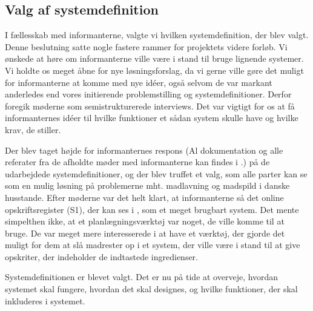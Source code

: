 \subsection{Valg af systemdefinition}
\label{subsec:valgafsystemdefinition}

I fællesskab med informanterne, valgte vi hvilken systemdefinition, der blev valgt. Denne beslutning satte nogle fastere rammer for projektets videre forløb. Vi ønskede at høre om informanterne ville være i stand til bruge lignende systemer. Vi holdte os meget åbne for nye løsningsforslag, da vi gerne ville gøre det muligt for informanterne at komme med nye idéer, også selvom de var markant anderledes end vores initierende problemstilling og systemdefinitioner. Derfor foregik møderne som semistrukturerede interviews. Det var vigtigt for os at få informanternes idéer til hvilke funktioner et sådan system skulle have og hvilke krav, de stiller.

Der blev taget højde for informanternes respons (Al dokumentation og alle referater fra de afholdte møder med informanterne kan findes i .) på de udarbejdede systemdefinitioner, og der blev truffet et valg, som alle parter kan se som en mulig løsning på problemerne mht. madlavning og madspild i danske husstande. Efter møderne var det helt klart, at informanterne så det online opskriftsregister (S1), der kan ses i , som et meget brugbart system. Det mente simpelthen ikke, at et planlægningsværktøj var noget, de ville komme til at bruge. De var meget mere interesserede i at have et værktøj, der gjorde det muligt for dem at slå madrester op i et system, der ville være i stand til at give opskriter, der indeholder de indtastede ingredienser.

Systemdefinitionen er blevet valgt. Det er nu på tide at overveje, hvordan systemet skal fungere, hvordan det skal designes, og hvilke funktioner, der skal inkluderes i systemet.
